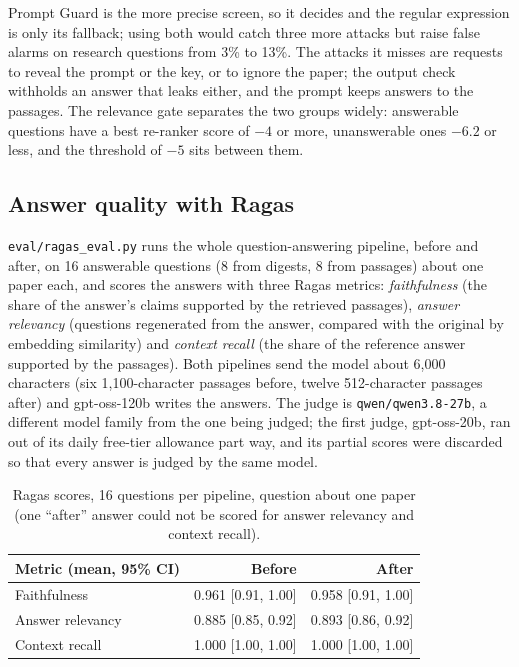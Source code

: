 \documentclass[11pt,a4paper]{article}
\newcommand{\code}[1]{\texttt{#1}}
\begin{document}
Prompt Guard is the more precise screen, so it decides and the regular expression is only its fallback;
using both would catch three more attacks but raise false alarms on research questions from 3\% to 13\%.
The attacks it misses are requests to reveal the prompt or the key, or to ignore the paper; the output check
withholds an answer that leaks either, and the prompt keeps answers to the passages. The relevance gate
separates the two groups widely: answerable questions have a best re-ranker score of $-4$ or more,
unanswerable ones $-6.2$ or less, and the threshold of $-5$ sits between them.

\subsection{Answer quality with Ragas}\label{sec:ragas}
\code{eval/ragas\_eval.py} runs the whole question-answering pipeline, before and after, on 16 answerable
questions (8 from digests, 8 from passages) about one paper each, and scores the answers with three Ragas
metrics: \emph{faithfulness} (the share of the answer's claims supported by the retrieved passages),
\emph{answer relevancy} (questions regenerated from the answer, compared with the original by embedding
similarity) and \emph{context recall} (the share of the reference answer supported by the passages). Both
pipelines send the model about 6,000 characters (six 1,100-character passages before, twelve 512-character
passages after) and gpt-oss-120b writes the answers. The judge is \code{qwen/qwen3.8-27b}, a different model
family from the one being judged; the first judge, gpt-oss-20b, ran out of its daily free-tier allowance
part way, and its partial scores were discarded so that every answer is judged by the same model.

\begin{table}[htbp]\centering\small
\begin{tabular}{@{}lrr@{}}
\toprule
Metric (mean, 95\% CI) & Before & After \\
\midrule
Faithfulness & 0.961 [0.91, 1.00] & 0.958 [0.91, 1.00] \\
Answer relevancy & 0.885 [0.85, 0.92] & 0.893 [0.86, 0.92] \\
Context recall & 1.000 [1.00, 1.00] & 1.000 [1.00, 1.00] \\
\bottomrule
\end{tabular}
\caption{Ragas scores, 16 questions per pipeline, question about one paper (one ``after'' answer could not be
scored for answer relevancy and context recall).}\label{tab:ragas}
\end{table}
\end{document}

